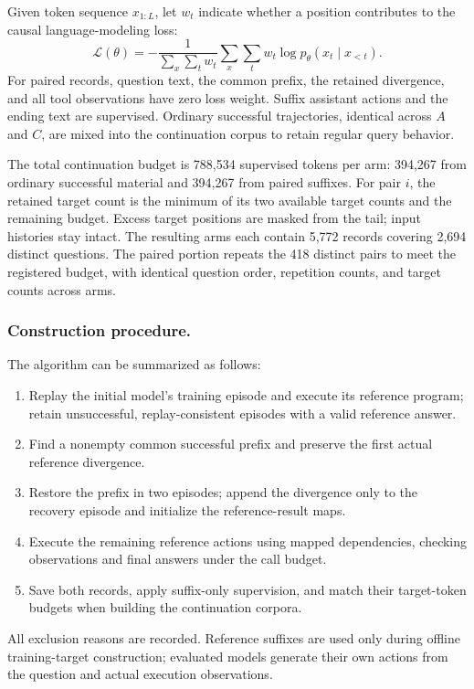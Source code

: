 \documentclass[a4paper,12pt]{article}
\begin{document}
Given token sequence $x_{1:L}$, let $w_t$ indicate whether a position contributes to the causal language-modeling loss:
\begin{equation}
 \mathcal{L}(\theta)=
 -\frac{1}{\sum_x\sum_t w_t}
 \sum_x\sum_t w_t\log p_\theta(x_t\mid x_{<t}).
\end{equation}
For paired records, question text, the common prefix, the retained divergence, and all tool observations have zero loss weight. Suffix assistant actions and the ending text are supervised. Ordinary successful trajectories, identical across $A$ and $C$, are mixed into the continuation corpus to retain regular query behavior.

The total continuation budget is 788,534 supervised tokens per arm: 394,267 from ordinary successful material and 394,267 from paired suffixes. For pair $i$, the retained target count is the minimum of its two available target counts and the remaining budget. Excess target positions are masked from the tail; input histories stay intact. The resulting arms each contain 5,772 records covering 2,694 distinct questions. The paired portion repeats the 418 distinct pairs to meet the registered budget, with identical question order, repetition counts, and target counts across arms.

\subsubsection{Construction procedure.}
The algorithm can be summarized as follows:
\begin{enumerate}
 \item Replay the initial model's training episode and execute its reference program; retain unsuccessful, replay-consistent episodes with a valid reference answer.
 \item Find a nonempty common successful prefix and preserve the first actual reference divergence.
 \item Restore the prefix in two episodes; append the divergence only to the recovery episode and initialize the reference-result maps.
 \item Execute the remaining reference actions using mapped dependencies, checking observations and final answers under the call budget.
 \item Save both records, apply suffix-only supervision, and match their target-token budgets when building the continuation corpora.
\end{enumerate}
All exclusion reasons are recorded. Reference suffixes are used only during offline training-target construction; evaluated models generate their own actions from the question and actual execution observations.
\end{document}
